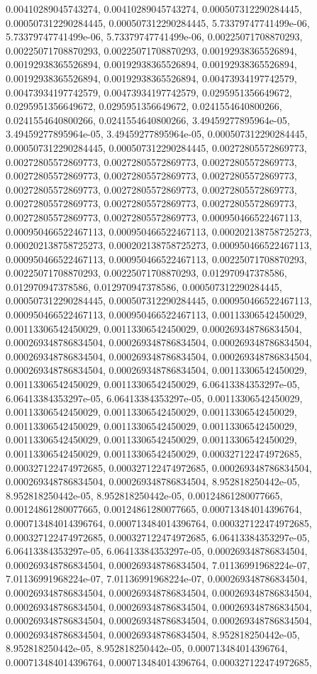 \documentclass[
  ,man]{apa6}
\begin{document}
0.00410289045743274, 0.00410289045743274, 0.000507312290284445, 0.000507312290284445, 0.000507312290284445, 5.73379747741499e-06, 5.73379747741499e-06, 5.73379747741499e-06, 0.00225071708870293, 0.00225071708870293, 0.00225071708870293, 0.00192938365526894, 0.00192938365526894, 0.00192938365526894, 0.00192938365526894, 0.00192938365526894, 0.00192938365526894, 0.00473934197742579, 0.00473934197742579, 0.00473934197742579, 0.0295951356649672, 0.0295951356649672, 0.0295951356649672, 0.0241554640800266,
0.0241554640800266, 0.0241554640800266, 3.49459277895964e-05, 3.49459277895964e-05, 3.49459277895964e-05, 0.000507312290284445, 0.000507312290284445, 0.000507312290284445, 0.00272805572869773, 0.00272805572869773, 0.00272805572869773, 0.00272805572869773, 0.00272805572869773, 0.00272805572869773, 0.00272805572869773, 0.00272805572869773, 0.00272805572869773, 0.00272805572869773, 0.00272805572869773, 0.00272805572869773, 0.00272805572869773, 0.00272805572869773, 0.00272805572869773, 0.000950466522467113,
0.000950466522467113, 0.000950466522467113, 0.000202138758725273, 0.000202138758725273, 0.000202138758725273, 0.000950466522467113, 0.000950466522467113, 0.000950466522467113, 0.00225071708870293, 0.00225071708870293, 0.00225071708870293, 0.012970947378586, 0.012970947378586, 0.012970947378586, 0.000507312290284445, 0.000507312290284445, 0.000507312290284445, 0.000950466522467113, 0.000950466522467113, 0.000950466522467113, 0.00113306542450029, 0.00113306542450029, 0.00113306542450029, 0.000269348786834504,
0.000269348786834504, 0.000269348786834504, 0.000269348786834504, 0.000269348786834504, 0.000269348786834504, 0.000269348786834504, 0.000269348786834504, 0.000269348786834504, 0.00113306542450029, 0.00113306542450029, 0.00113306542450029, 6.06413384353297e-05, 6.06413384353297e-05, 6.06413384353297e-05, 0.00113306542450029, 0.00113306542450029, 0.00113306542450029, 0.00113306542450029, 0.00113306542450029, 0.00113306542450029, 0.00113306542450029, 0.00113306542450029, 0.00113306542450029, 0.00113306542450029,
0.00113306542450029, 0.00113306542450029, 0.000327122474972685, 0.000327122474972685, 0.000327122474972685, 0.000269348786834504, 0.000269348786834504, 0.000269348786834504, 8.952818250442e-05, 8.952818250442e-05, 8.952818250442e-05, 0.00124861280077665, 0.00124861280077665, 0.00124861280077665, 0.000713484014396764, 0.000713484014396764, 0.000713484014396764, 0.000327122474972685, 0.000327122474972685, 0.000327122474972685, 6.06413384353297e-05, 6.06413384353297e-05, 6.06413384353297e-05, 0.000269348786834504,
0.000269348786834504, 0.000269348786834504, 7.01136991968224e-07, 7.01136991968224e-07, 7.01136991968224e-07, 0.000269348786834504, 0.000269348786834504, 0.000269348786834504, 0.000269348786834504, 0.000269348786834504, 0.000269348786834504, 0.000269348786834504, 0.000269348786834504, 0.000269348786834504, 0.000269348786834504, 0.000269348786834504, 0.000269348786834504, 8.952818250442e-05, 8.952818250442e-05, 8.952818250442e-05, 0.000713484014396764, 0.000713484014396764, 0.000713484014396764, 0.000327122474972685,
\end{document}
